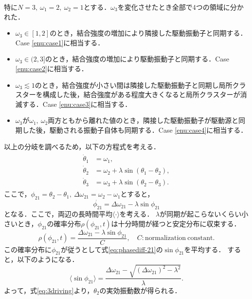 \documentclass[../main]{subfiles}
\begin{document}
特に$N=3,\ \omega_1=2,\ \omega_2=1$とする．$\omega_3$を変化させたとき全部で4つの領域に分かれた．
\begin{itemize}
    \item $\omega_3\in[1,2]$のとき，結合強度の増加により隣接した駆動振動子と同期する．Case \ref{enu:case1}に相当する．
    \item $\omega_3\in(2,3]$のとき，結合強度の増加により駆動振動子と同期する．Case \ref{enu:case2}に相当する．
    \item $\omega_3\lesssim 1$のとき，結合強度が小さい間は隣接した駆動振動子と同期し局所クラスターを構成した後，結合強度がある程度大きくなると局所クラスターが消滅する．Case \ref{enu:case3}に相当する．
    \item $\omega_3$が$\omega_1,\ \omega_2$両方ともから離れた値のとき，隣接した駆動振動子が駆動源と同期した後，駆動される振動子自体も同期する．Case \ref{enu:case4}に相当する．
\end{itemize}
以上の分岐を調べるため，以下の方程式を考える．
\begin{align}
    \label{eq:3driving}
    \begin{split}
        \dot{\theta}_1&=\omega_1,\\
        \dot{\theta}_2&=\omega_2+\lambda\sin(\theta_1-\theta_2),\\
        \dot{\theta}_3&=\omega_3+\lambda\sin(\theta_2-\theta_3).
    \end{split}
\end{align}
ここで，$\phi_{21}=\theta_2-\theta_1,\ \Delta\omega_{21}=\omega_2-\omega_1$とすると，
\begin{equation}
    \label{eq:phasediff-21}
    \dot{\phi_{21}}=\Delta\omega_{21}-\lambda\sin\phi_{21}
\end{equation}
となる．ここで，両辺の長時間平均$\langle\cdot\rangle$を考える．
$\lambda$が同期が起こらないくらい小さいとき，$\phi_{21}$の確率分布$\rho(\phi_{21},t)$は十分時間が経つと安定分布に収束する．
\begin{equation}
    \rho(\phi_{21},t)=\frac{\Delta\omega_{21}-\lambda\sin\phi_{21}}{C},\quad C:\mathrm{normalization\ constant}.
\end{equation}
この確率分布に$\phi_{21}$が従うとして式\eqref{eq:phasediff-21}の$\sin\phi_{21}$を平均する．
すると，以下のようになる．
\begin{equation}
    \langle\sin\phi_{21}\rangle=\frac{\Delta\omega_{21}-\sqrt{(\Delta\omega_{21})^2-\lambda^2}}{\lambda}.
\end{equation}
よって，式\eqref{eq:3driving}より，$\theta_2$の実効振動数が得られる．
\end{document}
